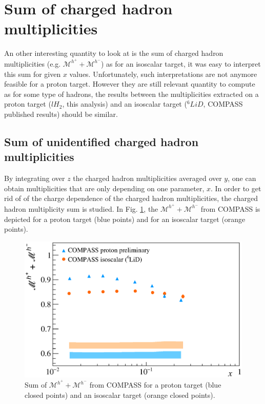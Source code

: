 \section{Sum of charged hadron multiplicities}

An other interesting quantity to look at is the sum of charged hadron multiplicities (e.g. $\mathscr{M}^{h^+}+\mathscr{M}^{h^-}$) as for an isoscalar target, it was easy to interpret this sum for given $x$ values. Unfortunately, such interpretations are not anymore feasible for a proton target. However they are still relevant quantity to compute as for some type of hadrons, the results between the multiplicities extracted on a proton target ($lH_2$, this analysis) and an isoscalar target ($^6LiD$, COMPASS published results) should be similar.

\subsection{Sum of unidentified charged hadron multiplicities}

By integrating over $z$ the charged hadron multiplicities averaged over $y$, one can obtain multiplicities that are only depending on one parameter, $x$. In order to get rid of of the charge dependence of the charged hadron multiplicities, the charged hadron multiplicity sum is studied. In Fig. \ref{pic:hsum}, the $\mathscr{M}^{h^+}+\mathscr{M}^{h^-}$ from COMPASS is depicted for a proton target (blue points) and for an isoscalar target (orange points).

\begin{figure}[!h]
  \centering
	\includegraphics[scale=0.5]{./gfx/Mult_h_sum.eps}
	\caption{Sum of $\mathscr{M}^{h^+}+\mathscr{M}^{h^-}$ from COMPASS for a proton target (blue closed points) and an isoscalar target (orange closed points).}
	\label{pic:hsum}
\end{figure}

